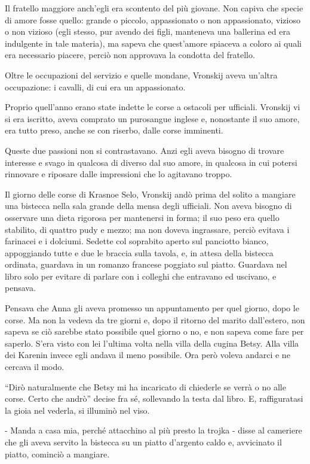 Il fratello maggiore anch'egli era scontento del più giovane. Non capiva che specie di amore fosse quello: grande o piccolo, appassionato o non appassionato, vizioso o non vizioso (egli stesso, pur avendo dei figli, manteneva una ballerina ed era indulgente in tale materia), ma sapeva che quest'amore spiaceva a coloro ai quali era necessario piacere, perciò non approvava la condotta del fratello. 

Oltre le occupazioni del servizio e quelle mondane, Vronskij aveva un'altra occupazione: i cavalli, di cui era un appassionato. 

Proprio quell'anno erano state indette le corse a ostacoli per ufficiali. Vronskij vi si era iscritto, aveva comprato un purosangue inglese e, nonostante il suo amore, era tutto preso, anche se con riserbo, dalle corse imminenti. 

Queste due passioni non si contrastavano. Anzi egli aveva bisogno di trovare interesse e svago in qualcosa di diverso dal suo amore, in qualcosa in cui potersi rinnovare e riposare dalle impressioni che lo agitavano troppo. 

Il giorno delle corse di Krasnoe Selo, Vronskij andò prima del solito a mangiare una bistecca nella sala grande della mensa degli ufficiali. Non aveva bisogno di osservare una dieta rigorosa per mantenersi in forma; il suo peso era quello stabilito, di quattro pudy e mezzo; ma non doveva ingrassare, perciò evitava i farinacei e i dolciumi. Sedette col soprabito aperto sul panciotto bianco, appoggiando tutte e due le braccia sulla tavola, e, in attesa della bistecca ordinata, guardava in un romanzo francese poggiato sul piatto. Guardava nel libro solo per evitare di parlare con i colleghi che entravano ed uscivano, e pensava. 

Pensava che Anna gli aveva promesso un appuntamento per quel giorno, dopo le corse. Ma non la vedeva da tre giorni e, dopo il ritorno del marito dall'estero, non sapeva se ciò sarebbe stato possibile quel giorno o no, e non sapeva come fare per saperlo. S'era visto con lei l'ultima volta nella villa della cugina Betsy. Alla villa dei Karenin invece egli andava il meno possibile. Ora però voleva andarci e ne cercava il modo. 

``Dirò naturalmente che Betsy mi ha incaricato di chiederle se verrà o no alle corse. Certo che andrò'' decise fra sé, sollevando la testa dal libro. E, raffiguratasi la gioia nel vederla, si illuminò nel viso. 

- Manda a casa mia, perché attacchino al più presto la trojka - disse al cameriere che gli aveva servito la bistecca su un piatto d'argento caldo e, avvicinato il piatto, cominciò a mangiare. 

